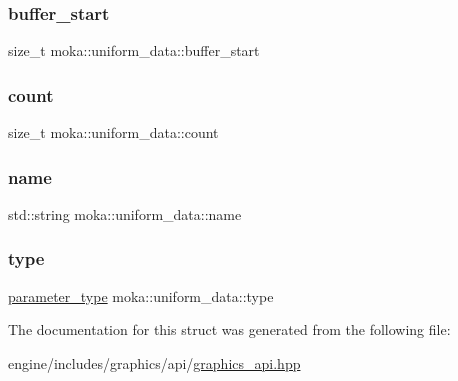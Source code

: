 \subsubsection{\texorpdfstring{buffer\_start}{buffer\_start}}
{\footnotesize\ttfamily size\+\_\+t moka\+::uniform\+\_\+data\+::buffer\+\_\+start}

\mbox{\label{structmoka_1_1uniform__data_af3016a77d03f6ee4263b54e17cfb6dd0}} 
\subsubsection{\texorpdfstring{count}{count}}
{\footnotesize\ttfamily size\+\_\+t moka\+::uniform\+\_\+data\+::count}

\mbox{\label{structmoka_1_1uniform__data_a7cd79fb927e43cdf08783f2c55467dae}} 
\subsubsection{\texorpdfstring{name}{name}}
{\footnotesize\ttfamily std\+::string moka\+::uniform\+\_\+data\+::name}

\mbox{\label{structmoka_1_1uniform__data_ac0fbbec5500fdf92cc84e56cbcff9d6d}} 
\subsubsection{\texorpdfstring{type}{type}}
{\footnotesize\ttfamily \mbox{\hyperlink{namespacemoka_aed2224bc0e5b79e57a8975ded94ee1aa}{parameter\+\_\+type}} moka\+::uniform\+\_\+data\+::type}



The documentation for this struct was generated from the following file\+:\begin{DoxyCompactItemize}
\item 
engine/includes/graphics/api/\mbox{\hyperlink{graphics__api_8hpp}{graphics\+\_\+api.\+hpp}}\end{DoxyCompactItemize}

